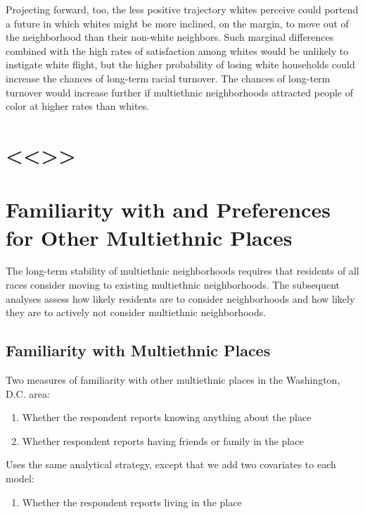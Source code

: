 \documentclass{baderart}
\providecommand{\tightlist}{%
  \setlength{\itemsep}{0pt}\setlength{\parskip}{0pt}}
\begin{document}
Projecting forward, too, the less positive trajectory whites perceive
could portend a future in which whites might be more inclined, on the
margin, to move out of the neighborhood than their non-white neighbors.
Such marginal differences combined with the high rates of satisfaction
among whites would be unlikely to instigate white flight, but the higher
probability of losing white households could increase the chances of
long-term racial turnover. The chances of long-term turnover would
increase further if multiethnic neighborhoods attracted people of color
at higher rates than whites.

\section{\textless{}\textless{}\textgreater{}\textgreater{}}\label{section-3}

\section{Familiarity with and Preferences for Other Multiethnic
Places}\label{familiarity-with-and-preferences-for-other-multiethnic-places}

The long-term stability of multiethnic neighborhoods requires that
residents of all races consider moving to existing multiethnic
neighborhoods. The subsequent analyses assess how likely residents are
to consider neighborhoods and how likely they are to actively not
consider multiethnic neighborhoods.

\subsection{Familiarity with Multiethnic
Places}\label{familiarity-with-multiethnic-places}

Two measures of familiarity with other multiethnic places in the
Washington, D.C. area:

\begin{enumerate}
\def\labelenumi{\arabic{enumi}.}
\tightlist
\item
  Whether the respondent reports knowing anything about the place
\item
  Whether respondent reports having friends or family in the place
\end{enumerate}

Uses the same analytical strategy, except that we add two covariates to
each model:

\begin{enumerate}
\def\labelenumi{\arabic{enumi}.}
\tightlist
\item
  Whether the respondent reports living in the place
\end{enumerate}
\end{document}
